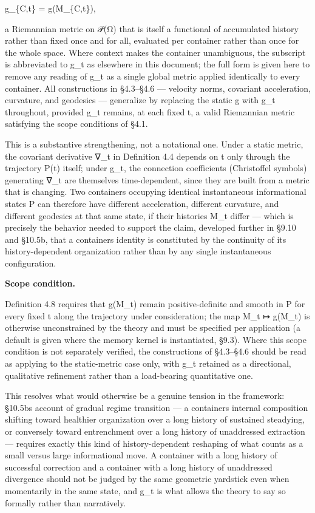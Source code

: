 \documentclass[
]{article}
\begin{document}
g\_\{C,t\} = g(M\_\{C,t\}),

a Riemannian metric on 𝒫(Ω) that is itself a functional of accumulated
history rather than fixed once and for all, evaluated per container
rather than once for the whole space. Where context makes the container
unambiguous, the subscript is abbreviated to g\_t as elsewhere in this
document; the full form is given here to remove any reading of g\_t as a
single global metric applied identically to every container. All
constructions in §4.3--§4.6 --- velocity norms, covariant acceleration,
curvature, and geodesics --- generalize by replacing the static g with
g\_t throughout, provided g\_t remains, at each fixed t, a valid
Riemannian metric satisfying the scope conditions of §4.1.

This is a substantive strengthening, not a notational one. Under a
static metric, the covariant derivative ∇\_t in Definition 4.4 depends
on t only through the trajectory P(t) itself; under g\_t, the connection
coefficients (Christoffel symbols) generating ∇\_t are themselves
time-dependent, since they are built from a metric that is changing. Two
containers occupying identical instantaneous informational states P can
therefore have different acceleration, different curvature, and
different geodesics at that same state, if their histories M\_t differ
--- which is precisely the behavior needed to support the claim,
developed further in §9.10 and §10.5b, that a
container\textquotesingle s identity is constituted by the continuity of
its history-dependent organization rather than by any single
instantaneous configuration.

\textbf{Scope condition.}

Definition 4.8 requires that g(M\_t) remain positive-definite and smooth
in P for every fixed t along the trajectory under consideration; the map
M\_t ↦ g(M\_t) is otherwise unconstrained by the theory and must be
specified per application (a default is given where the memory kernel is
instantiated, §9.3). Where this scope condition is not separately
verified, the constructions of §4.3--§4.6 should be read as applying to
the static-metric case only, with g\_t retained as a directional,
qualitative refinement rather than a load-bearing quantitative one.

This resolves what would otherwise be a genuine tension in the
framework: §10.5b\textquotesingle s account of gradual regime transition
--- a container\textquotesingle s internal composition shifting toward
healthier organization over a long history of sustained steadying, or
conversely toward entrenchment over a long history of unaddressed
extraction --- requires exactly this kind of history-dependent reshaping
of what counts as a small versus large informational move. A container
with a long history of successful correction and a container with a long
history of unaddressed divergence should not be judged by the same
geometric yardstick even when momentarily in the same state, and g\_t is
what allows the theory to say so formally rather than narratively.
\end{document}
